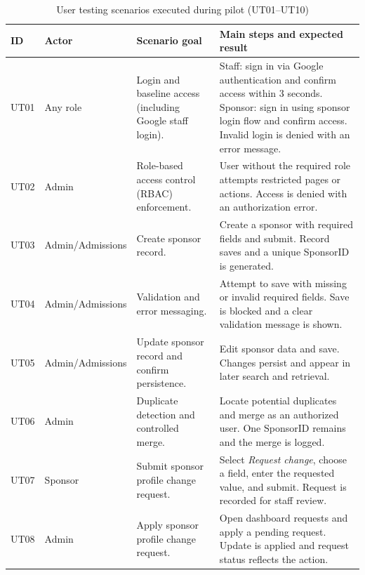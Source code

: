\begin{table}[htbp]
\centering
\caption{User testing scenarios executed during pilot (UT01--UT10)}
\label{tab:user_scenarios}
\small
\renewcommand{\arraystretch}{1.20}
\setlength{\tabcolsep}{4pt}
\begin{tabularx}{\linewidth}{@{}
  >{\RaggedRight\arraybackslash}p{1.1cm}
  >{\RaggedRight\arraybackslash}p{2.9cm}
  Y
  Y
@{}}
\toprule
\textbf{ID} & \textbf{Actor} & \textbf{Scenario goal} & \textbf{Main steps and expected result} \\
\midrule
UT01 & Any role &
Login and baseline access (including Google staff login). &
Staff: sign in via Google authentication and confirm access within 3 seconds. Sponsor: sign in using sponsor login flow and confirm access. Invalid login is denied with an error message. \\

UT02 & Admin &
Role-based access control (RBAC) enforcement. &
User without the required role attempts restricted pages or actions. Access is denied with an authorization error. \\

UT03 & Admin/\allowbreak Admissions &
Create sponsor record. &
Create a sponsor with required fields and submit. Record saves and a unique SponsorID is generated. \\

UT04 & Admin/\allowbreak Admissions &
Validation and error messaging. &
Attempt to save with missing or invalid required fields. Save is blocked and a clear validation message is shown. \\

UT05 & Admin/\allowbreak Admissions &
Update sponsor record and confirm persistence. &
Edit sponsor data and save. Changes persist and appear in later search and retrieval. \\

UT06 & Admin &
Duplicate detection and controlled merge. &
Locate potential duplicates and merge as an authorized user. One SponsorID remains and the merge is logged. \\

UT07 & Sponsor &
Submit sponsor profile change request. &
Select \emph{Request change}, choose a field, enter the requested value, and submit. Request is recorded for staff review. \\

UT08 & Admin &
Apply sponsor profile change request. &
Open dashboard requests and apply a pending request. Update is applied and request status reflects the action. \\


\end{tabularx}
\end{table}
